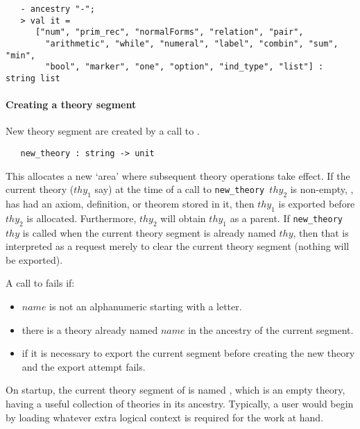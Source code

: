 \begin{holboxed}
{\small
\begin{verbatim}
   - ancestry "-";
   > val it =
      ["num", "prim_rec", "normalForms", "relation", "pair",
        "arithmetic", "while", "numeral", "label", "combin", "sum", "min",
        "bool", "marker", "one", "option", "ind_type", "list"] : string list
\end{verbatim}
}
\end{holboxed}


\paragraph{Creating a theory segment}

%
New theory segment are created by a call to .
%
\begin{holboxed}
\begin{verbatim}
   new_theory : string -> unit
\end{verbatim}
\end{holboxed}
%
This allocates a new `area' where subsequent theory
operations take effect. If the current theory ($thy_1$ say) at the time
of a call to {\small\verb+new_theory +}$thy_2$ is non-empty, \ie, has
had an axiom, definition, or theorem stored in it, then $thy_1$ is
exported before $thy_2$ is allocated. Furthermore, $thy_2$ will obtain
$thy_1$ as a parent. If {\small\verb+new_theory +}$thy$ is called when
the current theory segment is already named $thy$, then that is
interpreted as a request merely to clear the current theory segment
(nothing will be exported).

A call to  fails if:
\begin{itemize}
\item $name$ is not an alphanumeric starting with a letter.

\item there is a theory already named $name$ in the ancestry of the
current segment.

\item if it is necessary to export the current segment before creating
the new theory and the export attempt fails.
\end{itemize}

On startup, the current theory segment of \HOL{} is named ,
which is an empty theory, having a useful collection of theories in
its ancestry. Typically, a user would begin by loading whatever extra
logical context is required for the work at hand.

